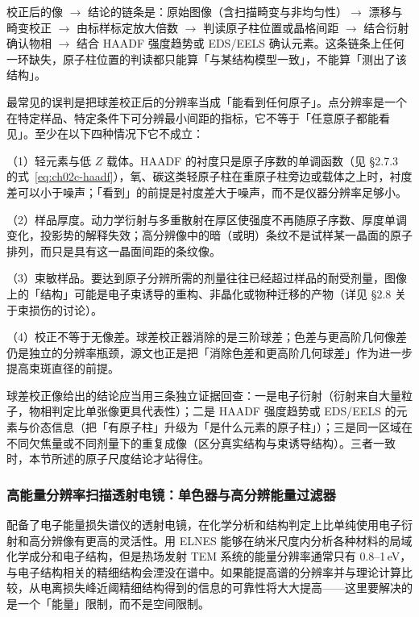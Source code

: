 \begin{dataflow}
校正后的像 $\to$ 结论的链条是：原始图像（含扫描畸变与非均匀性）$\to$ 漂移与畸变校正 $\to$ 由标样标定放大倍数 $\to$ 判读原子柱位置或晶格间距 $\to$ 结合衍射确认物相 $\to$ 结合 HAADF 强度趋势或 EDS/EELS 确认元素。这条链条上任何一环缺失，原子柱位置的判读都只能算「与某结构模型一致」，不能算「测出了该结构」。
\end{dataflow}

\begin{pitfall}
最常见的误判是把球差校正后的分辨率当成「能看到任何原子」。点分辨率是一个在特定样品、特定条件下可分辨最小间距的指标，它不等于「任意原子都能看见」。至少在以下四种情况下它不成立：

（1）轻元素与低 $Z$ 载体。HAADF 的衬度只是原子序数的单调函数（见 \S 2.7.3 的式~\eqref{eq:ch02c-haadf}），氧、碳这类轻原子柱在重原子柱旁边或载体之上时，衬度差可以小于噪声；「看到」的前提是衬度差大于噪声，而不是仪器分辨率足够小。

（2）样品厚度。动力学衍射与多重散射在厚区使强度不再随原子序数、厚度单调变化，投影势的解释失效；高分辨像中的暗（或明）条纹不是试样某一晶面的原子排列，而只是具有这一晶面间距的条纹像。

（3）束敏样品。要达到原子分辨所需的剂量往往已经超过样品的耐受剂量，图像上的「结构」可能是电子束诱导的重构、非晶化或物种迁移的产物（详见 \S 2.8 关于束损伤的讨论）。

（4）校正不等于无像差。球差校正器消除的是三阶球差；色差与更高阶几何像差仍是独立的分辨率瓶颈，源文也正是把「消除色差和更高阶几何球差」作为进一步提高束斑直径的前提。
\end{pitfall}

\begin{crosscheck}
球差校正像给出的结论应当用三条独立证据回查：一是电子衍射（衍射来自大量粒子，物相判定比单张像更具代表性）；二是 HAADF 强度趋势或 EDS/EELS 的元素与价态信息（把「有原子柱」升级为「是什么元素的原子柱」）；三是同一区域在不同欠焦量或不同剂量下的重复成像（区分真实结构与束诱导结构）。三者一致时，本节所述的原子尺度结论才站得住。
\end{crosscheck}

\subsubsection{高能量分辨率扫描透射电镜：单色器与高分辨能量过滤器}

配备了电子能量损失谱仪的透射电镜，在化学分析和结构判定上比单纯使用电子衍射和高分辨像有更高的灵活性。用 ELNES 能够在纳米尺度内分析各种材料的局域化学成分和电子结构，但是热场发射 TEM 系统的能量分辨率通常只有 0.8--1\,eV，与电子结构相关的精细结构会湮没在谱中。如果能提高谱的分辨率并与理论计算比较，从电离损失峰近阈精细结构得到的信息的可靠性将大大提高——这里要解决的是一个「能量」限制，而不是空间限制。

